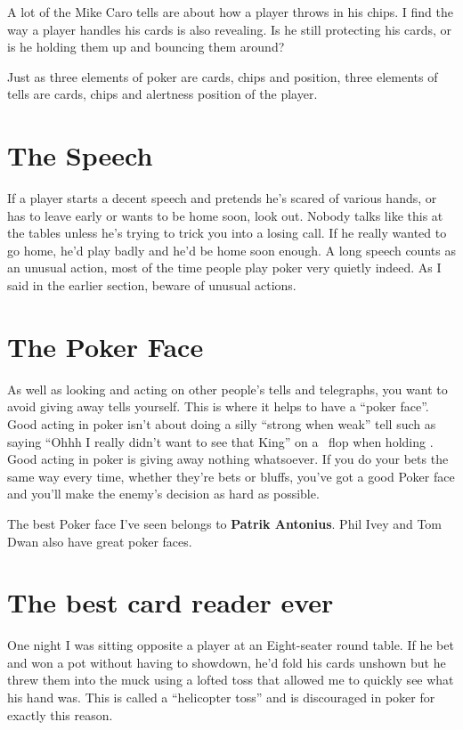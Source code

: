 A lot of the Mike Caro tells are about how a player
throws in his chips. I find the way a player
handles his cards is also revealing. Is he still protecting
his cards, or is he holding them up and bouncing them around?

Just as three elements of poker are cards, chips and position,
three elements of tells are cards, chips and alertness position
of the player.

\section{The Speech}

If a player starts a decent speech and pretends he's scared of various
hands, or has to leave early or wants to be home soon, look out.
Nobody talks like this at the tables unless he's trying to trick
you into a losing call. If he really wanted to go home, he'd play
badly and he'd be home soon enough. A long speech counts as an unusual
action, most of the time people play poker very quietly indeed. As I
said in the earlier section, beware of unusual actions.

\section{The Poker Face}

As well as looking and acting on other people's tells and telegraphs,
you want to avoid giving away tells yourself. This is where it helps
to have a ``poker face''. Good acting in poker isn't about doing
a silly ``strong when weak'' tell such as saying ``Ohhh I really
didn't want to see that King'' on a \Kh\Qd\eigc\ flop when holding \Ks\Kc.
Good acting in poker is giving away nothing whatsoever. If you do your
bets the same way every time, whether they're bets or bluffs, 
you've got a good Poker face and you'll make the enemy's decision as
hard as possible.

The best Poker face I've seen belongs to \textbf{Patrik
Antonius}. Phil Ivey and Tom Dwan also have great poker faces.

\section{The best card reader ever}

One night I was sitting opposite a player at an Eight-seater round
table. If he bet and won a pot without having to showdown, he'd
fold his cards unshown but he threw them into the muck using a lofted toss
that allowed me to quickly see what his hand was. This is called
a ``helicopter toss'' and is discouraged in poker for exactly this reason.

